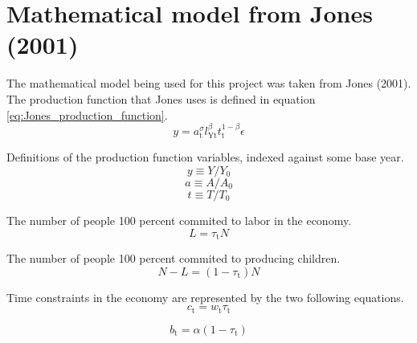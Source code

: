 \documentclass[letterpaper,12pt]{article}
\begin{document}

\section{Mathematical model from Jones (2001)}

The mathematical model being used for this project was taken from Jones (2001). The production function that Jones uses is defined in equation \ref{eq:Jones_production_function}.
\begin{equation} \label{eq:Jones_production_function}
y = a_\mathrm{t} ^\sigma l_\mathrm{Yt} ^\beta t_\mathrm{t} ^{1-\beta} \epsilon
\end{equation}

Definitions of the production function variables, indexed against some base year.
\begin{equation} \label{eq:index_y}
y \equiv Y/Y_\mathrm{0}
\end{equation}
\begin{equation} \label{eq:index_a}
a \equiv A/A_\mathrm{0}
\end{equation}
\begin{equation} \label{eq:index_t}
t \equiv T/T_\mathrm{0}
\end{equation}

The number of people 100 percent commited to labor in the economy.
\begin{equation}\label{eq:pop_work}
L = \tau_\mathrm{t} N
\end{equation}

The number of people 100 percent commited to producing children.
\begin{equation} \label{eq:pop_birth}
N-L = (1-\tau_\mathrm{t})N
\end{equation}

Time constraints in the economy are represented by the two following equations.
\begin{equation} \label{eq:consumption}
c_\mathrm{t} = w_\mathrm{t} \tau_\mathrm{t}
\end{equation}

\begin{equation} \label{eq:birth}
b_\mathrm{t} = \alpha (1-\tau_\mathrm{t})
\end{equation}
\end{document}
